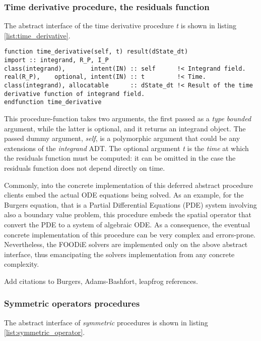\subsubsection{Time derivative procedure, the residuals function}

The abstract interface of the time derivative procedure \emph{t} is shown in listing \ref{list:time_derivative}.

\begin{lstlisting}[firstnumber=1,style=code,caption={time derivative procedure interface},label={list:time_derivative}]
function time_derivative(self, t) result(dState_dt)
import :: integrand, R_P, I_P
class(integrand),       intent(IN) :: self      !< Integrand field.
real(R_P),    optional, intent(IN) :: t         !< Time.
class(integrand), allocatable      :: dState_dt !< Result of the time derivative function of integrand field.
endfunction time_derivative
\end{lstlisting}

This procedure-function takes two arguments, the first passed as a \emph{type bounded} argument, while the latter is optional, and it returns an integrand object. The passed dummy argument, \emph{self}, is a polymorphic argument that could be any extensions of the \emph{integrand} ADT. The optional argument \emph{t} is the \emph{time} at which the residuals function must be computed: it can be omitted in the case the residuals function does not depend directly on time.

Commonly, into the concrete implementation of this deferred abstract procedure clients embed the actual ODE equations being solved. As an example, for the Burgers equation, that is a Partial Differential Equations (PDE) system involving also a boundary value problem, this procedure embeds the spatial operator that convert the PDE to a system of algebraic ODE. As a consequence, the eventual concrete implementation of this procedure can be very complex and errors-prone. Nevertheless, the FOODiE solvers are implemented only on the above abstract interface, thus emancipating the solvers implementation from any concrete complexity.

{\color{red} Add citations to Burgers, Adams-Bashfort, leapfrog references.}

\subsubsection{Symmetric operators procedures}

The abstract interface of \emph{symmetric} procedures is shown in listing \ref{list:symmetric_operator}.

